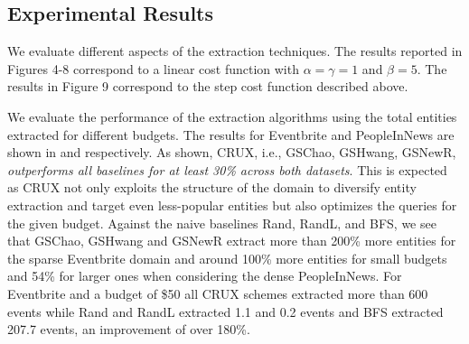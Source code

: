 
\subsection{Experimental Results}
We evaluate different aspects of the extraction techniques. The results reported in Figures 4-8 correspond to a linear cost function with $\alpha=\gamma=1$ and $\beta=5$. The results in Figure 9 correspond to the step cost function described above.

We evaluate the performance of the extraction algorithms using the total entities extracted for different budgets. The results for Eventbrite and PeopleInNews are shown in  and  respectively. As shown, CRUX, i.e., GSChao, GSHwang, GSNewR, {\em outperforms all baselines for at least 30\% across both datasets}. This is expected as CRUX not only exploits the structure of the domain to diversify entity extraction and target even less-popular entities but also optimizes the queries for the given budget. Against the naive baselines Rand, RandL, and BFS, we see that GSChao, GSHwang and GSNewR extract more than 200\% more entities for the sparse Eventbrite domain and around 100\% more entities for small budgets and 54\% for larger ones when considering the dense PeopleInNews. For Eventbrite and a budget of \$50 all CRUX schemes extracted more than 600 events while Rand and RandL extracted 1.1 and 0.2 events and BFS extracted 207.7 events, an improvement of over 180\%.

